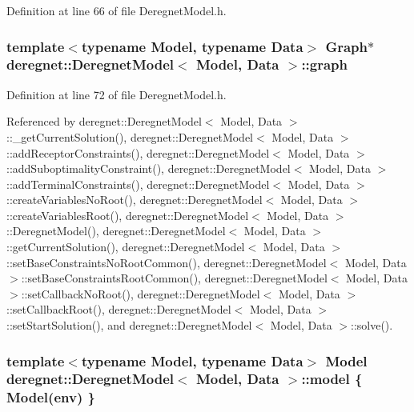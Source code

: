 Definition at line 66 of file Deregnet\+Model.\+h.

\subsubsection[{\texorpdfstring{graph}{graph}}]{\setlength{\rightskip}{0pt plus 5cm}template$<$typename Model, typename Data$>$ {\bf Graph}$\ast$ {\bf deregnet\+::\+Deregnet\+Model}$<$ Model, {\bf Data} $>$\+::graph\hspace{0.3cm}{\ttfamily [protected]}}\hypertarget{classderegnet_1_1DeregnetModel_a3cd2f54b8e061ef5bed32708d9bc1ef1}{}\label{classderegnet_1_1DeregnetModel_a3cd2f54b8e061ef5bed32708d9bc1ef1}


Definition at line 72 of file Deregnet\+Model.\+h.



Referenced by deregnet\+::\+Deregnet\+Model$<$ Model, Data $>$\+::\+\_\+get\+Current\+Solution(), deregnet\+::\+Deregnet\+Model$<$ Model, Data $>$\+::add\+Receptor\+Constraints(), deregnet\+::\+Deregnet\+Model$<$ Model, Data $>$\+::add\+Suboptimality\+Constraint(), deregnet\+::\+Deregnet\+Model$<$ Model, Data $>$\+::add\+Terminal\+Constraints(), deregnet\+::\+Deregnet\+Model$<$ Model, Data $>$\+::create\+Variables\+No\+Root(), deregnet\+::\+Deregnet\+Model$<$ Model, Data $>$\+::create\+Variables\+Root(), deregnet\+::\+Deregnet\+Model$<$ Model, Data $>$\+::\+Deregnet\+Model(), deregnet\+::\+Deregnet\+Model$<$ Model, Data $>$\+::get\+Current\+Solution(), deregnet\+::\+Deregnet\+Model$<$ Model, Data $>$\+::set\+Base\+Constraints\+No\+Root\+Common(), deregnet\+::\+Deregnet\+Model$<$ Model, Data $>$\+::set\+Base\+Constraints\+Root\+Common(), deregnet\+::\+Deregnet\+Model$<$ Model, Data $>$\+::set\+Callback\+No\+Root(), deregnet\+::\+Deregnet\+Model$<$ Model, Data $>$\+::set\+Callback\+Root(), deregnet\+::\+Deregnet\+Model$<$ Model, Data $>$\+::set\+Start\+Solution(), and deregnet\+::\+Deregnet\+Model$<$ Model, Data $>$\+::solve().

\subsubsection[{\texorpdfstring{model}{model}}]{\setlength{\rightskip}{0pt plus 5cm}template$<$typename Model, typename Data$>$ Model {\bf deregnet\+::\+Deregnet\+Model}$<$ Model, {\bf Data} $>$\+::model \{ Model({\bf env}) \}\hspace{0.3cm}{\ttfamily [protected]}}\hypertarget{classderegnet_1_1DeregnetModel_a30d525de2086e342b33fe3e45ede4947}{}\label{classderegnet_1_1DeregnetModel_a30d525de2086e342b33fe3e45ede4947}


